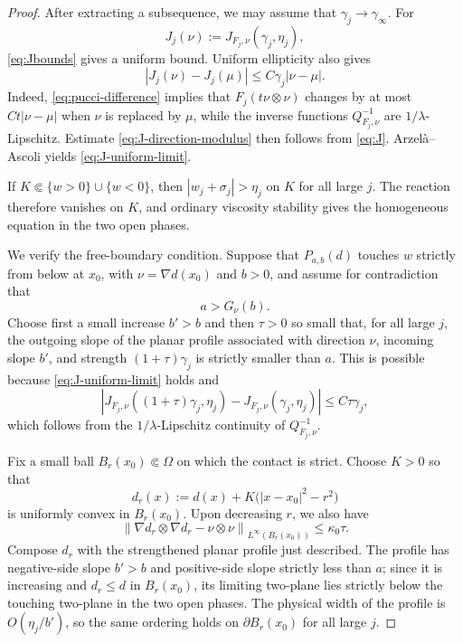 \documentclass[11pt,letterpaper]{amsart}
\numberwithin{equation}{section}
\newcommand{\norm}[1]{\left\lVert #1\right\rVert}
\theoremstyle{definition}
\theoremstyle{remark}
\begin{document}
\begin{proof}
After extracting a subsequence, we may assume that
$\gamma_j\to\gamma_\infty$. For
$$
J_j(\nu)
:=
J_{F_j,\nu}(\gamma_j,\eta_j),
$$
\eqref{eq:Jbounds} gives a uniform bound. Uniform ellipticity also gives
\begin{equation}\label{eq:J-direction-modulus}
|J_j(\nu)-J_j(\mu)|
\leq
C\gamma_j|\nu-\mu|.
\end{equation}
Indeed, \eqref{eq:pucci-difference} implies that
$F_j(t\nu\otimes\nu)$ changes by at most
$Ct|\nu-\mu|$ when $\nu$ is replaced by $\mu$, while the inverse functions
$Q_{F_j,\nu}^{-1}$ are $1/\lambda$-Lipschitz. Estimate
\eqref{eq:J-direction-modulus} then follows from \eqref{eq:J}.
Arzel\`a--Ascoli yields \eqref{eq:J-uniform-limit}.

If $K\Subset\{w>0\}\cup\{w<0\}$, then
$|w_j+\sigma_j|>\eta_j$ on $K$ for all large $j$. The reaction therefore
vanishes on $K$, and ordinary viscosity stability gives the homogeneous
equation in the two open phases.

We verify the free-boundary condition. Suppose that $P_{a,b}(d)$ touches
$w$ strictly from below at $x_0$, with
$\nu=\nabla d(x_0)$ and $b>0$, and assume for contradiction that
$$
a>G_\nu(b).
$$
Choose first a small increase $b'>b$ and then $\tau>0$ so small that, for
all large $j$, the outgoing slope of the planar profile associated with
direction $\nu$, incoming slope $b'$, and strength
$(1+\tau)\gamma_j$ is strictly smaller than $a$. This is possible because
\eqref{eq:J-uniform-limit} holds and
\begin{equation}\label{eq:J-strength-continuity}
\left|
J_{F_j,\nu}((1+\tau)\gamma_j,\eta_j)
-
J_{F_j,\nu}(\gamma_j,\eta_j)
\right|
\leq
C\tau\gamma_j,
\end{equation}
which follows from the $1/\lambda$-Lipschitz continuity of
$Q_{F_j,\nu}^{-1}$.

Fix a small ball $B_r(x_0)\Subset\Omega$ on which the contact is strict.
Choose $K>0$ so that
$$
d_r(x)
:=
d(x)+K\bigl(|x-x_0|^2-r^2\bigr)
$$
is uniformly convex in $B_r(x_0)$. Upon decreasing $r$, we also have
$$
\norm{
\nabla d_r\otimes\nabla d_r-\nu\otimes\nu
}_{L^\infty(B_r(x_0))}
\leq
\kappa_0\tau.
$$
Compose $d_r$ with the strengthened planar profile just described. The
profile has negative-side slope $b'>b$ and positive-side slope strictly less
than $a$; since it is increasing and $d_r\leq d$ in $B_r(x_0)$, its limiting
two-plane lies strictly below the touching two-plane in the two open phases.
The physical width of the profile is $O(\eta_j/b')$, so the same ordering
holds on $\partial B_r(x_0)$ for all large $j$.


\end{proof}
\end{document}
